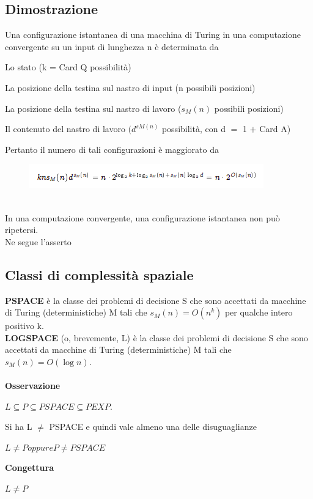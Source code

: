 \subsection{Dimostrazione}
Una configurazione istantanea di una macchina di Turing in una computazione convergente su un input di lunghezza n è determinata da
\begin{center}
    \item Lo stato (k = Card Q possibilità)
    \item La posizione della testina sul nastro di input (n possibili posizioni)
    \item La posizione della testina sul nastro di lavoro ($s_M (n)$ possibili posizioni)
    \item Il contenuto del nastro di lavoro $(d^{sM(n)}$ possibilità, con d $=$ 1 $+$ Card A)
\end{center}
Pertanto il numero di tali configurazioni è maggiorato da\\
\begin{figure}[htp]
    \centering
    \includegraphics[scale=0.8]{tesi_stile/img/foto4cap16.png}
\end{figure}
\\In una computazione convergente, una configurazione istantanea non può ripetersi.
\\Ne segue l’asserto
\subsection{Classi di complessità spaziale}
\textbf{PSPACE} è la classe dei problemi di decisione S che sono accettati da
macchine di Turing (deterministiche) M tali che $s_M(n) = O(n^k)$ per qualche intero positivo k.
\\\textbf{LOGSPACE} (o, brevemente, L) è la classe dei problemi di decisione S che sono accettati da macchine di Turing (deterministiche) M tali che $s_M(n) = O(\log n).$\\\\
\textbf{Osservazione}
\begin{center}
    $L \subseteq P \subseteq PSPACE \subseteq PEXP$.
\end{center}
Si ha L $\neq$ PSPACE e quindi vale almeno una delle disuguaglianze
\begin{center}
    $L \neq P oppure P\neq PSPACE$
\end{center}
\textbf{Congettura}\\
\begin{center}
     $L \neq P$
\end{center}
\newpage
